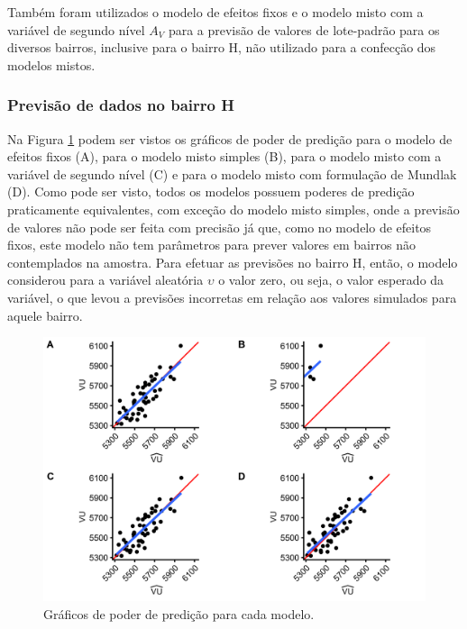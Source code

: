 \documentclass[
  a4paper, 11pt]{article}
\begin{document}
Também foram utilizados o modelo de efeitos fixos e o modelo misto com a
variável de segundo nível \(A_V\) para a previsão de valores de
lote-padrão para os diversos bairros, inclusive para o bairro H, não
utilizado para a confecção dos modelos mistos.

\hypertarget{previsuxe3o-de-dados-no-bairro-h}{%
\subsubsection{Previsão de dados no bairro
H}\label{previsuxe3o-de-dados-no-bairro-h}}

Na Figura \ref{fig:powerPlots} podem ser vistos os gráficos de poder de
predição para o modelo de efeitos fixos (A), para o modelo misto simples
(B), para o modelo misto com a variável de segundo nível (C) e para o
modelo misto com formulação de Mundlak (D). Como pode ser visto, todos
os modelos possuem poderes de predição praticamente equivalentes, com
exceção do modelo misto simples, onde a previsão de valores não pode ser
feita com precisão já que, como no modelo de efeitos fixos, este modelo
não tem parâmetros para prever valores em bairros não contemplados na
amostra. Para efetuar as previsões no bairro H, então, o modelo
considerou para a variável aleatória \(\upsilon\) o valor zero, ou seja,
o valor esperado da variável, o que levou a previsões incorretas em
relação aos valores simulados para aquele bairro.

\begin{figure}[H]

{\centering \includegraphics[width=1\linewidth]{images/powerPlots-1} 

}

\caption{Gráficos de poder de predição para cada modelo.}\label{fig:powerPlots}
\end{figure}
\end{document}
